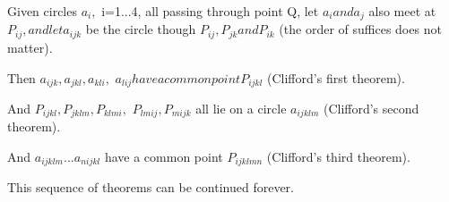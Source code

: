  Given circles $a_{i},$  i=1...4, all passing through
point Q, let $a_{i} and a_{j}$  also meet at $P_{ij}, and let a_{ijk}$  be the circle
though $P_{ij}, P_{jk} and P_{ik}$  
(the order of suffices does not matter).
\par
Then $a_{ijk}, a_{jkl}, a_{kli},$  $a_{lij} have a common point P_{ijkl}$  (Clifford's
first theorem).
\par
And $P_{ijkl}, P_{jklm}, P_{klmi},$  $P_{lmij}, P_{mijk}$  all lie on a circle $a_{ijklm}$  (Clifford's second theorem).
\par
And $a_{ijklm}...a_{nijkl}$  have a common 
point $P_{ijklmn}$  (Clifford's third theorem).
\par
This sequence of theorems can be continued forever.